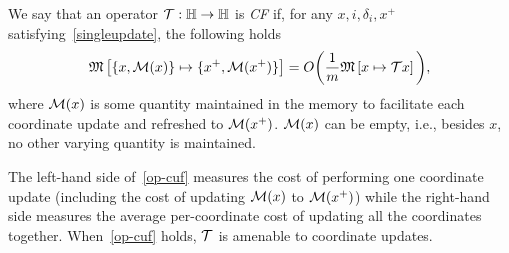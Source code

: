 \begin{definition}[CF operator]
 We say that an operator ${\mathcal{T}}:\mathbb{H}\to\mathbb{H}$ is \emph{CF} if, for any $x,i,\delta_i,x^+$ satisfying~\eqref{singleupdate}, the following holds
\begin{equation}\label{op-cuf} \nops{\{x,\cM(x)\}}{\{x^+,\cM(x^+)\}}= O\bigg(\frac{1}{m}\nops{x}{\cT x}\bigg),
\end{equation}
where ${\mathcal{M}}(x)$ is some quantity maintained in the memory to facilitate each coordinate update and refreshed to ${\mathcal{M}}(x^+)$. ${\mathcal{M}}(x)$ can be empty, i.e., besides $x$, no other varying quantity is maintained.
\end{definition}


The left-hand side of~\eqref{op-cuf} measures the cost of performing one coordinate update (including the cost of updating ${\mathcal{M}}(x)$ to ${\mathcal{M}}(x^+)$)  while the right-hand side measures the average per-coordinate cost of updating all the coordinates together. When~\eqref{op-cuf} holds, ${\mathcal{T}}$ is amenable to coordinate updates.

